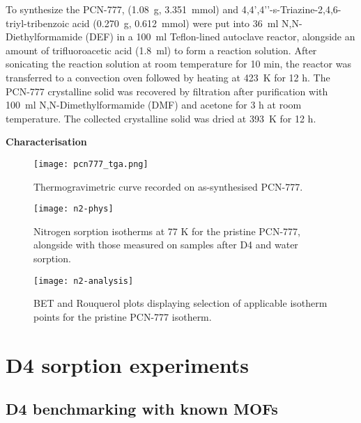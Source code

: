To synthesize the PCN-777,  (\SI{1.08}{\gram},
\SI{3.351}{\milli\mol}) and 4,4’,4’’-s-Triazine-2,4,6-triyl-tribenzoic acid
(\SI{0.270}{\gram}, \SI{0.612}{\milli\mol}) were put into \SI{36}{\milli\litre}
N,N-Diethylformamide (DEF) in a \SI{100}{\milli\litre} Teflon-lined autoclave
reactor, alongside an amount of trifluoroacetic acid (\SI{1.8}{\milli\litre}) to
form a reaction solution. After sonicating the reaction solution at room
temperature for 10 min, the reactor was transferred to a convection oven
followed by heating at \SI{423}{\kelvin} for 12 h. The PCN-777 crystalline solid
was recovered by filtration after purification with \SI{100}{\milli\litre}
N,N-Dimethylformamide (DMF) and acetone for 3 h at room temperature. The
collected crystalline solid was dried at \SI{393}{\kelvin} for 12 h.

\textbf{Characterisation}

\begin{figure}[H]
    \centering
    \texttt{[image: pcn777\_tga.png]}
    \caption{%
        Thermogravimetric curve recorded on as-synthesised PCN-777.
    }\label{fig:tga}
\end{figure}

\begin{figure}[H]
    \centering
    \texttt{[image: n2-phys]}
    \caption{%
        Nitrogen sorption isotherms at 77 K for the pristine
        PCN-777, alongside with those measured on samples after D4 and water
        sorption.
    }\label{fig:n2-phys}
\end{figure}


\begin{figure}[H]
    \centering
    \texttt{[image: n2-analysis]}
    \caption{%
        BET and Rouquerol plots displaying selection of applicable
        isotherm points for the pristine PCN-777 isotherm.
    }\label{fig:n2-analysis}
\end{figure}

\pagebreak


\section{D4 sorption experiments}\label{d4-sorption-experiments}

\subsection{D4 benchmarking with known MOFs}\label{d4-benchmarking-with-known-mofs}

